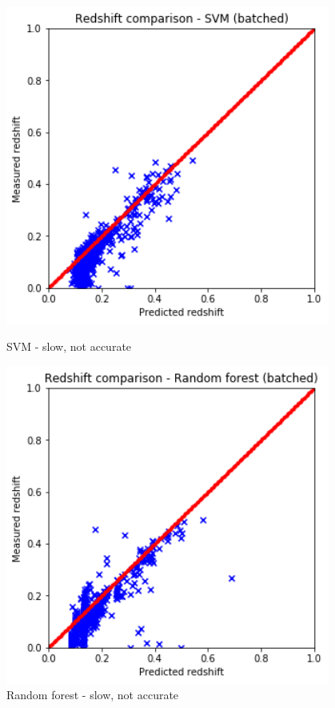 \documentclass[a4paper,12pt]{article}
\begin{document}
\begin{figure}[H]
	\centering
	\begin{minipage}{0.5\textwidth}
		\centering
		\includegraphics[width=0.95\textwidth]{./algos3.png}
		\caption{ SVM - slow, not accurate }
	\end{minipage}\hfill
	\begin{minipage}{0.5\textwidth}
		\centering
		\includegraphics[width=0.95\textwidth]{./algos4.png}
		\caption{ Random forest - slow, not accurate }
	\end{minipage}
\end{figure}
\end{document}
